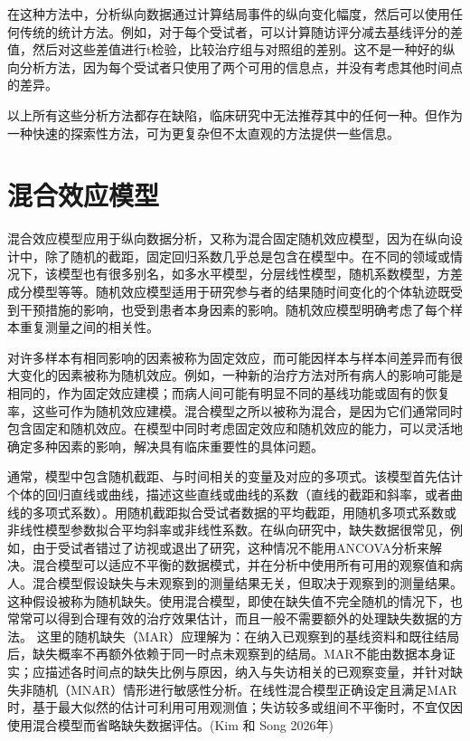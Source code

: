 \documentclass[
  chinese-hans,
  letterpaper,
  DIV=11,
  numbers=noendperiod]{scrreprt}
\begin{document}
在这种方法中，分析纵向数据通过计算结局事件的纵向变化幅度，然后可以使用任何传统的统计方法。例如，对于每个受试者，可以计算随访评分减去基线评分的差值，然后对这些差值进行t检验，比较治疗组与对照组的差别。这不是一种好的纵向分析方法，因为每个受试者只使用了两个可用的信息点，并没有考虑其他时间点的差异。

以上所有这些分析方法都存在缺陷，临床研究中无法推荐其中的任何一种。但作为一种快速的探索性方法，可为更复杂但不太直观的方法提供一些信息。

\section{混合效应模型}\label{ux6df7ux5408ux6548ux5e94ux6a21ux578b}

混合效应模型应用于纵向数据分析，又称为混合固定随机效应模型，因为在纵向设计中，除了随机的截距，固定回归系数几乎总是包含在模型中。在不同的领域或情况下，该模型也有很多别名，如多水平模型，分层线性模型，随机系数模型，方差成分模型等等。随机效应模型适用于研究参与者的结果随时间变化的个体轨迹既受到干预措施的影响，也受到患者本身因素的影响。随机效应模型明确考虑了每个样本重复测量之间的相关性。

对许多样本有相同影响的因素被称为固定效应，而可能因样本与样本间差异而有很大变化的因素被称为随机效应。例如，一种新的治疗方法对所有病人的影响可能是相同的，作为固定效应建模；而病人间可能有明显不同的基线功能或固有的恢复率，这些可作为随机效应建模。混合模型之所以被称为混合，是因为它们通常同时包含固定和随机效应。在模型中同时考虑固定效应和随机效应的能力，可以灵活地确定多种因素的影响，解决具有临床重要性的具体问题。

通常，模型中包含随机截距、与时间相关的变量及对应的多项式。该模型首先估计个体的回归直线或曲线，描述这些直线或曲线的系数（直线的截距和斜率，或者曲线的多项式系数）。用随机截距拟合受试者数据的平均截距，用随机多项式系数或非线性模型参数拟合平均斜率或非线性系数。在纵向研究中，缺失数据很常见，例如，由于受试者错过了访视或退出了研究，这种情况不能用ANCOVA分析来解决。混合模型可以适应不平衡的数据模式，并在分析中使用所有可用的观察值和病人。混合模型假设缺失与未观察到的测量结果无关，但取决于观察到的测量结果。这种假设被称为随机缺失。使用混合模型，即使在缺失值不完全随机的情况下，也常常可以得到合理有效的治疗效果估计，而且一般不需要额外的处理缺失数据的方法。
这里的随机缺失（MAR）应理解为：在纳入已观察到的基线资料和既往结局后，缺失概率不再额外依赖于同一时点未观察到的结局。MAR不能由数据本身证实；应描述各时间点的缺失比例与原因，纳入与失访相关的已观察变量，并针对缺失非随机（MNAR）情形进行敏感性分析。在线性混合模型正确设定且满足MAR时，基于最大似然的估计可利用可用观测值；失访较多或组间不平衡时，不宜仅因使用混合模型而省略缺失数据评估。(Kim
和 Song 2026年)
\end{document}
